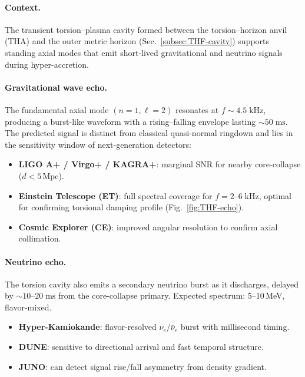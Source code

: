 \documentclass{article}
\begin{document}
\paragraph{Context.}
The transient torsion--plasma cavity formed between the torsion--horizon anvil (THA)
and the outer metric horizon (Sec.~\ref{subsec:THF-cavity})
supports standing axial modes that emit short-lived gravitational and neutrino signals
during hyper-accretion.

\paragraph{Gravitational wave echo.}
The fundamental axial mode \((n=1,\ell=2)\) resonates at \(f \sim 4.5\;\mathrm{kHz}\),
producing a burst-like waveform with a rising--falling envelope
lasting \(\sim50\;\mathrm{ms}\).
The predicted signal is distinct from classical quasi-normal ringdown
and lies in the sensitivity window of next-generation detectors:

\begin{itemize}
\item \textbf{LIGO A+ / Virgo+ / KAGRA+}: marginal SNR for nearby core-collapse (\(d<5\,\mathrm{Mpc}\)).
\item \textbf{Einstein Telescope (ET)}: full spectral coverage for \(f = 2\text{--}6\;\mathrm{kHz}\),
       optimal for confirming torsional damping profile (Fig.~\ref{fig:THF-echo}).
\item \textbf{Cosmic Explorer (CE)}: improved angular resolution to confirm axial collimation.
\end{itemize}

\paragraph{Neutrino echo.}
The torsion cavity also emits a secondary neutrino burst as it discharges,
delayed by \(\sim10\text{--}20\;\mathrm{ms}\) from the core-collapse primary.
Expected spectrum: 5--10\,MeV, flavor-mixed.

\begin{itemize}
\item \textbf{Hyper-Kamiokande}: flavor-resolved \(\nu_e/\bar\nu_e\) burst with millisecond timing.
\item \textbf{DUNE}: sensitive to directional arrival and fast temporal structure.
\item \textbf{JUNO}: can detect signal rise/fall asymmetry from density gradient.
\end{itemize}
\end{document}
